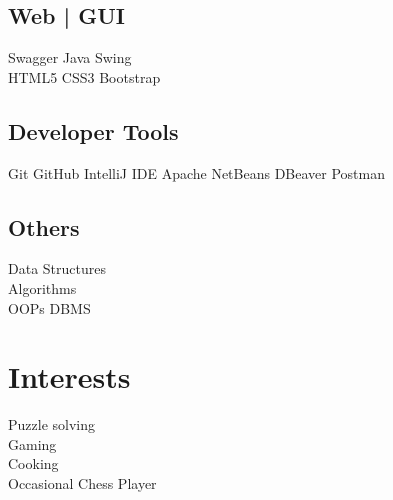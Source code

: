 \documentclass[]{deedy-resume-openfont}
\begin{document}
\begin{minipage}[t]{0.33\textwidth}
\subsection{Web | GUI}
\textbullet{} Swagger
\textbullet{} Java Swing \\ \textbullet{} HTML5 \textbullet{} CSS3 \textbullet{} Bootstrap \\
\sectionsep

\subsection{Developer Tools}
 \textbullet{} Git \textbullet{} GitHub \textbullet{} IntelliJ IDE \textbullet{} Apache NetBeans \textbullet{} DBeaver \textbullet{} Postman\\


\sectionsep

\subsection{Others}
\textbullet{} Data Structures  \\ \textbullet{} Algorithms \\
\textbullet{} OOPs 
\textbullet{} DBMS 
\sectionsep


\section{Interests}
\textbullet{} Puzzle solving  \\ 
\textbullet{} Gaming  \\ 
\textbullet{} Cooking \\
\textbullet{} Occasional Chess Player \\
\sectionsep

%
%

\end{minipage} 
\hfill
\end{document}
